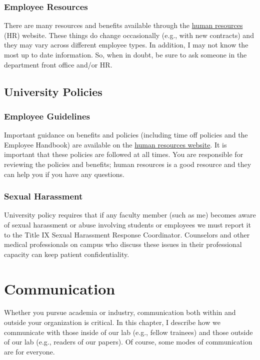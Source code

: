 \documentclass[letterpaper,11pt,oneside]{memoir}
\begin{document}
\subsection{Employee Resources}

There are many resources and benefits available through the \href{https://www.temple.edu/faculty-and-staff/working-temple/human-resources}{human resources} (HR) website. These things do change occasionally (e.g., with new contracts) and they may vary across different employee types. In addition, I may not know the most up to date information. So, when in doubt, be sure to ask someone in the department front office and/or HR. 



\section{University Policies}

\subsection{Employee Guidelines}
Important guidance on benefits and policies (including time off policies and the Employee Handbook) are available on the \href{https://www.temple.edu/faculty-and-staff/working-temple/human-resources}{human resources website}. It is important that these policies are followed at all times. You are responsible for reviewing the policies and benefits; human resources is a good resource and they can help you if you have any questions.

\subsection{Sexual Harassment}
University policy requires that if any faculty member (such as me) becomes aware of sexual harassment or abuse involving students or employees we must report it to the Title IX Sexual Harassment Response Coordinator. Counselors and other medical professionals on campus who discuss these issues in their professional capacity can keep patient confidentiality.



\chapter{Communication}

Whether you pursue academia or industry, communication both within and outside your organization is critical. In this chapter, I describe how we communicate with those inside of our lab (e.g., fellow trainees) and those outside of our lab (e.g., readers of our papers). Of course, some modes of communication are for everyone.
\end{document}
